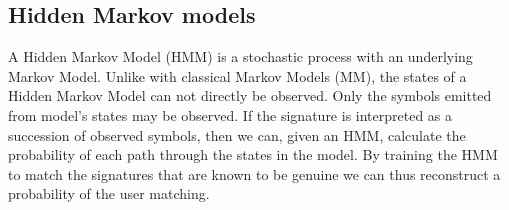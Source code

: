 \documentclass[a4paper, oneside]{csthesis}
\begin{document}







\subsection{Hidden Markov models}


A Hidden Markov Model (HMM) is a stochastic process with an underlying Markov Model.
Unlike with classical Markov Models (MM), the states of a Hidden Markov Model can not directly be observed. Only the symbols emitted from model's states may be observed. If the signature is interpreted as a succession of observed symbols, then we can, given an HMM, calculate the probability of each path through the states in the model. By training the HMM to match the signatures that are known to be genuine we can thus reconstruct a probability of the user matching.
\end{document}
